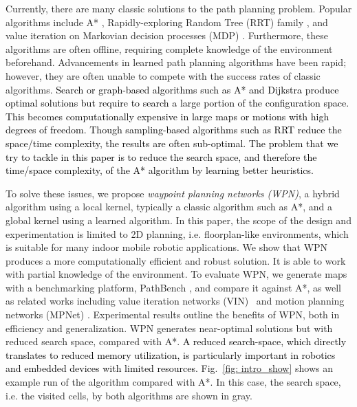 \documentclass[journal, twocolumn]{IEEEtran}
\begin{document}
Currently, there are many classic solutions to the path planning problem. Popular algorithms include A* \cite{choset2005principles, duchovn2014path, zhang2014multiple, 5937169}, Rapidly-exploring Random Tree (RRT) family \cite{lavalle1998rapidly, rodriguez2006obstacle, lavalle2001randomized, karaman2011sampling}, and value iteration on Markovian decision processes (MDP) \cite{szepesvari2010algorithms, satia1973markovian}. Furthermore, these algorithms are often offline, requiring complete knowledge of the environment beforehand. Advancements in learned path planning algorithms have been rapid; however, they are often unable to compete with the success rates of classic algorithms.
\textcolor{black}{Search or graph-based algorithms such as A* and Dijkstra produce optimal solutions but require to search a large portion of the configuration space. This becomes computationally expensive in large maps or motions with high degrees of freedom. Though sampling-based algorithms such as RRT reduce the space/time complexity, the results are often sub-optimal. The problem that we try to tackle in this paper is to reduce the search space, and therefore the time/space complexity, of the A* algorithm by learning better heuristics.}  


To solve these issues, we propose \textit{waypoint planning networks (WPN)}, a hybrid algorithm using a local kernel, typically a classic algorithm such as A*, and a global kernel using a learned algorithm. 
%
In this paper, the scope of the design and experimentation is limited to 2D planning, i.e. floorplan-like environments, which is suitable for many indoor mobile robotic applications.
%
We show that WPN produces a more computationally efficient and robust solution. It is able to work with partial knowledge of the environment. To evaluate WPN, we generate maps with a benchmarking platform, PathBench \cite{pathbench}, and compare it against A*, as well as related works including value iteration networks (VIN)~\cite{tamar2016value} and motion planning networks (MPNet) \cite{qureshi2019motion}. 
Experimental results outline the benefits of WPN, both in efficiency and generalization. WPN generates near-optimal solutions but with reduced search space, compared with A*. \textcolor{black}{A reduced search-space, which directly translates to reduced memory utilization, is particularly important in robotics and embedded devices with limited resources.} Fig.~\ref{fig: intro_show} shows an example run of the algorithm compared with A*. In this case, the search space, i.e. the visited cells, by both algorithms are shown in gray. 
\end{document}

